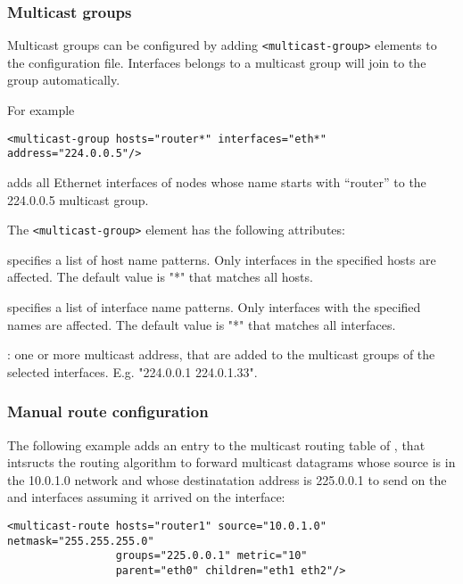 \subsubsection{Multicast groups}

Multicast groups can be configured by adding \verb!<multicast-group>!
elements to the configuration file. Interfaces belongs to a multicast
group will join to the group automatically.

For example
\begin{verbatim}
<multicast-group hosts="router*" interfaces="eth*" address="224.0.0.5"/>
\end{verbatim}
adds all Ethernet interfaces of nodes whose name starts with ``router''
to the 224.0.0.5 multicast group.

The \verb!<multicast-group>! element has the following attributes:
\begin{compactitem}
  \item {} specifies a list of host name patterns.
     Only interfaces in the specified hosts are affected. The default value
     is "*" that matches all hosts.

  \item {} specifies a list of interface name patterns.
     Only interfaces with the specified names are affected. The
     default value is "*" that matches all interfaces.

  \item {}: one or more multicast address, that are added
     to the multicast groups of the selected interfaces.
     E.g. "224.0.0.1 224.0.1.33".
\end{compactitem}


\subsubsection*{Manual route configuration}



The following example adds an entry to the multicast routing table of ,
that intsructs the routing algorithm to forward multicast datagrams whose source
is in the 10.0.1.0 network and whose destinatation address is 225.0.0.1 to
send on the  and  interfaces assuming it arrived on the
 interface:
 
\begin{verbatim}
<multicast-route hosts="router1" source="10.0.1.0" netmask="255.255.255.0"
                 groups="225.0.0.1" metric="10"
                 parent="eth0" children="eth1 eth2"/>
\end{verbatim}


